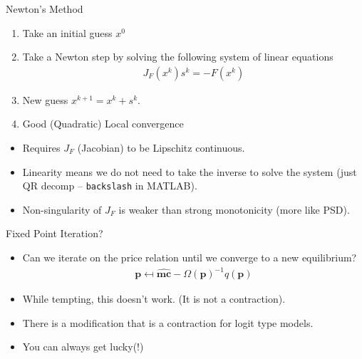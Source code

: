 \documentclass[xcolor=pdftex,dvipsnames,table,mathserif]{beamer}
\begin{document}
\begin{frame}{Newton's Method}
\begin{enumerate}
\item Take an initial guess $x^0$
\item Take a Newton step by solving the following system of linear equations
\begin{eqnarray*}
J_F(x^k) s^k = - F(x^k)
\end{eqnarray*}
\item New guess $x^{k+1} = x^k + s^k$.
\item Good (Quadratic) Local convergence
\end{enumerate}
\begin{itemize}
\item Requires $J_F$ (Jacobian) to be Lipschitz continuous. 
\item Linearity means we do not need to take the inverse to solve the system (just QR decomp -- \texttt{backslash} in MATLAB).
\item Non-singularity of $J_F$ is weaker than strong monotonicity (more like PSD).
\end{itemize}
\end{frame} 

\begin{frame}{Fixed Point Iteration?}
\begin{itemize}
\item Can we iterate on the price relation until we converge to a new equilibrium?
\begin{eqnarray*}
\mathbf{p} \mapsfrom \widehat{\mathbf{mc}} - \Omega(\mathbf{p})^{-1}q(\mathbf{p})
\end{eqnarray*}
\item While tempting, this doesn't work. (It is \alert{not} a contraction).
\item There is a modification that is a contraction for logit type models.
\item You can always get lucky(!)
\end{itemize}
\end{frame}
\end{document}
